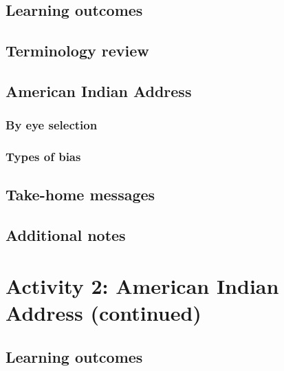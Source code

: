 \documentclass[
]{report}
\begin{document}
\hypertarget{learning-outcomes-1}{%
\subsection{Learning outcomes}\label{learning-outcomes-1}}

\hypertarget{terminology-review-1}{%
\subsection{Terminology review}\label{terminology-review-1}}

\hypertarget{american-indian-address}{%
\subsection{American Indian Address}\label{american-indian-address}}

\hypertarget{by-eye-selection}{%
\subsubsection*{By eye selection}\label{by-eye-selection}}

\hypertarget{types-of-bias}{%
\subsubsection*{Types of bias}\label{types-of-bias}}

\hypertarget{take-home-messages-1}{%
\subsection{Take-home messages}\label{take-home-messages-1}}

\hypertarget{additional-notes-1}{%
\subsection{Additional notes}\label{additional-notes-1}}

\hypertarget{activity-2-american-indian-address-continued}{%
\section{Activity 2: American Indian Address (continued)}\label{activity-2-american-indian-address-continued}}

\hypertarget{learning-outcomes-2}{%
\subsection{Learning outcomes}\label{learning-outcomes-2}}
\end{document}
